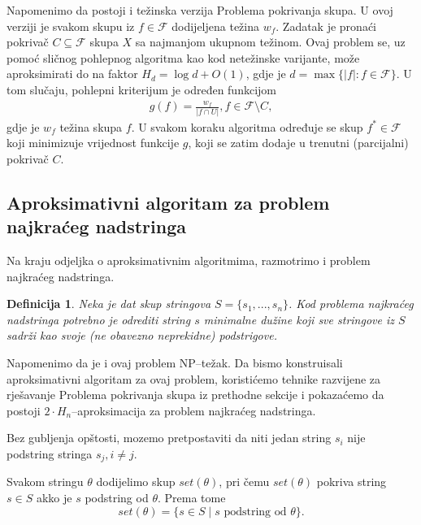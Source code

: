 \documentclass[a4paper, utf8, 11pt, colorlinks]{book}
\newtheorem{definition}{Definicija}[chapter]
\theoremstyle{definition}
\begin{document}
Napomenimo da postoji i težinska verzija Problema pokrivanja skupa. U ovoj verziji je svakom skupu iz $f \in\mathcal{F}$ dodijeljena težina $w_f$. Zadatak je pronaći pokrivač $C \subseteq \mathcal{F}$ skupa $X$ sa najmanjom ukupnom težinom. Ovaj problem se,  uz pomoć sličnog pohlepnog algoritma kao kod netežinske varijante, može aproksimirati do na faktor $H_d= \log d+O(1)$, gdje je $d= \max\{|f|:f \in \mathcal{F}\}$. U tom slučaju, pohlepni kriterijum je određen funkcijom 
\begin{align}
	g(f) = \frac{w_f}{|f \cap U|}, f \in \mathcal{F}\setminus C,
\end{align}
gdje je $w_f$ težina skupa $f$. U svakom koraku algoritma određuje se skup $f^* \in \mathcal{F}$ koji minimizuje vrijednost funkcije $g$, koji se zatim dodaje u trenutni (parcijalni) pokrivač $C$.

\subsection{Aproksimativni algoritam za problem najkraćeg nadstringa}

Na kraju odjeljka o aproksimativnim algoritmima, razmotrimo i problem najkraćeg nadstringa.
\begin{definition}
   Neka je dat skup stringova $S=\{s_1,...,s_n\}$. Kod problema najkraćeg nadstringa potrebno je odrediti string  $s$ minimalne dužine koji sve stringove iz $S$ sadrži kao svoje (ne obavezno neprekidne) podstrigove. 
  \end{definition}
Napomenimo da je i ovaj problem NP--težak. 
 Da bismo konstruisali aproksimativni algoritam za ovaj problem, koristićemo tehnike razvijene za rješavanje Problema pokrivanja skupa iz prethodne sekcije i pokazaćemo da postoji $2\cdot H_n$--aproksimacija za problem najkraćeg nadstringa. 

Bez gubljenja opštosti, mozemo pretpostaviti da niti jedan string $s_i$ nije podstring stringa $s_j, i\neq j$.

 Svakom stringu $\theta$ dodijelimo skup $set(\theta)$, pri čemu   $set(\theta)$ pokriva string $s\in S$ akko 
je $s$ podstring od $\theta$. Prema tome 
$$set(\theta) = \{ s \in S \mid s \mbox{  podstring od }\theta \}.$$
\end{document}
